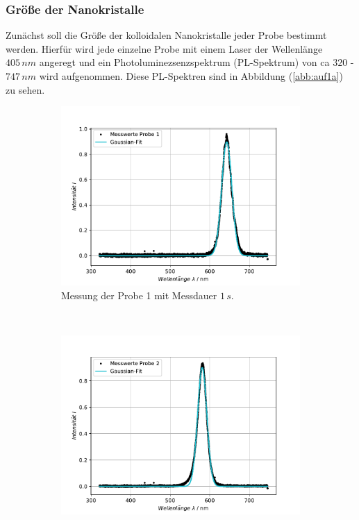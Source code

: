 	\subsubsection{ Gr\"{o}{\ss}e der Nanokristalle}
Zun\"{a}chst soll die Gr\"{o}{\ss}e der kolloidalen Nanokristalle jeder Probe bestimmt werden.
Hierf\"{u}r wird jede einzelne Probe mit einem Laser der Wellenl\"{a}nge $405 \, nm$ angeregt und ein Photoluminezsenzspektrum (PL-Spektrum) von ca $320$ - $747 \, nm$ wird aufgenommen.
Diese PL-Spektren sind in Abbildung (\ref{abb:auf1a}) zu sehen. 
\begin{figure}[H]
\centering
	\begin{subfigure}[t]{0.4\textwidth}
	\includegraphics[width=\textwidth]{Plots/aufgabe1a_P1.pdf}
	\caption{Messung der Probe 1 mit Messdauer $1 \, s$.}
	\label{abb:A1_P1}
	\end{subfigure}
	~
	\begin{subfigure}[t]{0.4\textwidth}
	\includegraphics[width=\textwidth]{Plots/aufgabe1a_P2.pdf}

\end{subfigure}
\end{figure}
